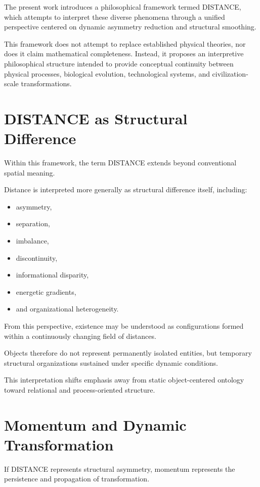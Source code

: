 \documentclass[11pt]{article}
\begin{document}
The present work introduces a philosophical framework termed DISTANCE, which attempts to interpret these diverse phenomena through a unified perspective centered on dynamic asymmetry reduction and structural smoothing.

This framework does not attempt to replace established physical theories, nor does it claim mathematical completeness. Instead, it proposes an interpretive philosophical structure intended to provide conceptual continuity between physical processes, biological evolution, technological systems, and civilization-scale transformations.

\section{DISTANCE as Structural Difference}

Within this framework, the term DISTANCE extends beyond conventional spatial meaning.

Distance is interpreted more generally as structural difference itself, including:

\begin{itemize}
    \item asymmetry,
    \item separation,
    \item imbalance,
    \item discontinuity,
    \item informational disparity,
    \item energetic gradients,
    \item and organizational heterogeneity.
\end{itemize}

From this perspective, existence may be understood as configurations formed within a continuously changing field of distances.

Objects therefore do not represent permanently isolated entities, but temporary structural organizations sustained under specific dynamic conditions.

This interpretation shifts emphasis away from static object-centered ontology toward relational and process-oriented structure.

\section{Momentum and Dynamic Transformation}

If DISTANCE represents structural asymmetry, momentum represents the persistence and propagation of transformation.
\end{document}
